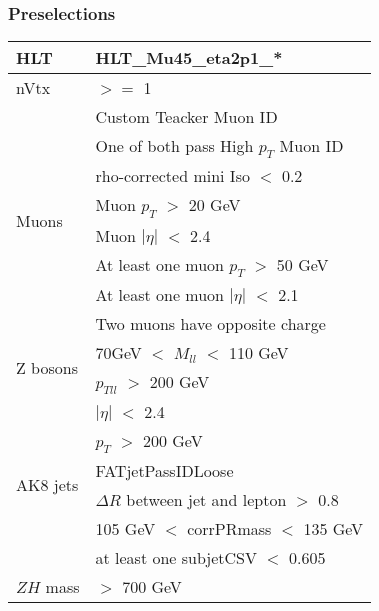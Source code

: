 \documentclass[7pt,aspectratio=1610]{beamer}
\begin{document}
\begin{frame}
  \frametitle{Preselections}
  \justifying
  \begin{tiny}
    \begin{center}
      \begin{tabular}[t]{ | l | l | }
        \hline
        HLT
        & HLT\_Mu45\_eta2p1\_*                           \\
        \hline
        nVtx                   
        & $>=$ 1                                         \\
        \hline
        \multirow{8}{*}{Muons}
        & Custom Teacker Muon ID                         \\
        & One of both pass High $p_T$ Muon ID            \\
        & rho-corrected mini Iso $<$ 0.2                 \\
        & Muon $p_T$ $>$ 20 GeV                          \\
        & Muon $|\eta|$ $<$ 2.4                          \\
        & At least one muon $p_T$ $>$ 50 GeV             \\
        & At least one muon $|\eta|$ $<$ 2.1             \\

        & Two muons have opposite charge                 \\
        \hline
        \multirow{2}{*}{Z bosons}
        & 70GeV $<$ $M_{ll}$ $<$ 110 GeV                 \\
        & $p_{Tll}$ $>$ 200 GeV                          \\
        \hline
        \multirow{6}{*}{AK8 jets}
        & $|\eta|$ $<$ 2.4                               \\
        & $p_T$ $>$ 200 GeV                              \\
        & FATjetPassIDLoose                              \\
        & $\Delta R$ between jet and lepton $>$ 0.8      \\
        & 105 GeV $<$ corrPRmass $<$ 135 GeV             \\
        & at least one subjetCSV $<$ 0.605               \\
        \hline
        $ZH$ mass             
        & $>$ 700 GeV                                    \\
        \hline
      \end{tabular}
    \end{center}
  \end{tiny}
\end{frame}
\end{document}
